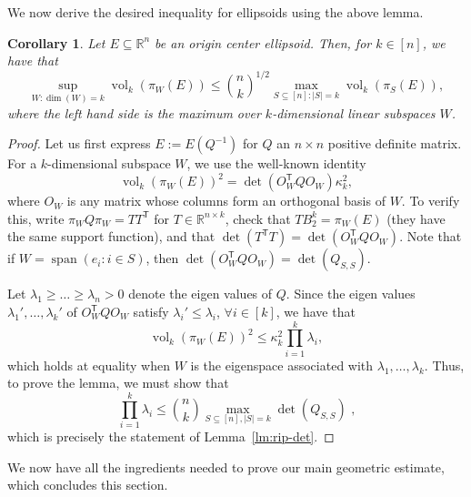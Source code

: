 \documentclass{article}
\newtheorem{corollary}[theorem]{Corollary}
\newcommand{\R}{{\mathbb{R}}}
\newcommand{\T}{\mathsf T}
\DeclareMathOperator{\vol}{vol}
\DeclareMathOperator{\lspan}{span}
\begin{document}
We now derive the desired inequality for ellipsoids using the above lemma.

\begin{corollary}\label{cor:ellipsoids}
Let $E \subseteq \R^n$ be an origin center ellipsoid. Then, for $k \in [n]$, we
have that
\[
\sup_{W: \dim(W)=k} \vol_k(\pi_W(E)) \le \binom{n}{k}^{1/2}
  \max_{S \subseteq [n]: |S| = k} \vol_k(\pi_S(E)),
\]
where the left hand side is the maximum over $k$-dimensional linear subspaces $W$.
\end{corollary}
\begin{proof}
Let us first express $E := E(Q^{-1})$ for $Q$ an $n \times n$ positive definite
matrix. For a $k$-dimensional subspace $W$, we use the well-known identity
\[
\vol_k(\pi_W(E))^2 = \det(O_W^\T Q O_W) \kappa^2_k,
\]
where $O_W$ is any matrix whose columns form an orthogonal basis of $W$. To
verify this, write $\pi_W Q \pi_W = T T^\T$ for $T \in \R^{n \times k}$, check
that $T B_2^k = \pi_W(E)$ (they have the same support function), and that
$\det(T^\T T) = \det(O_W^\T Q O_W)$. Note that if $W = \lspan(e_i: i \in S)$,
then $\det(O_W^\T Q O_W) = \det(Q_{S,S})$.

Let $\lambda_1 \geq \dots \geq \lambda_n > 0$ denote the eigen values of $Q$.
Since the eigen values $\lambda_1',\dots,\lambda_k'$ of $O_W^\T Q O_W$ satisfy
$\lambda_i' \leq \lambda_i$, $\forall i \in [k]$, we have that 
\[
\vol_k(\pi_W(E))^2 \leq \kappa_k^2 \prod_{i=1}^k \lambda_i, 
\]
which holds at equality when $W$ is the eigenspace associated with
$\lambda_1,\dots,\lambda_k$. Thus, to prove the lemma, we must show that
\[
\prod_{i=1}^k \lambda_i \leq \binom{n}{k} \max_{S \subseteq [n], |S|=k}
\det(Q_{S,S}) \text{ ,}
\]
which is precisely the statement of Lemma~\ref{lm:rip-det}.
\end{proof}

We now have all the ingredients needed to prove our main geometric estimate,
which concludes this section.
\end{document}
